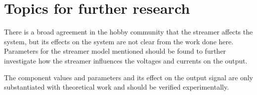 \section{Topics for further research}


There is a broad agreement in the hobby community that the streamer affects the system, but its effects on the system are not clear from the work done here. Parameters for the streamer model mentioned should be found to further investigate how the streamer influences the voltages and currents on the output.

The component values and parameters and its effect on the output signal are only substantiated with theoretical work and should be verified experimentally.
